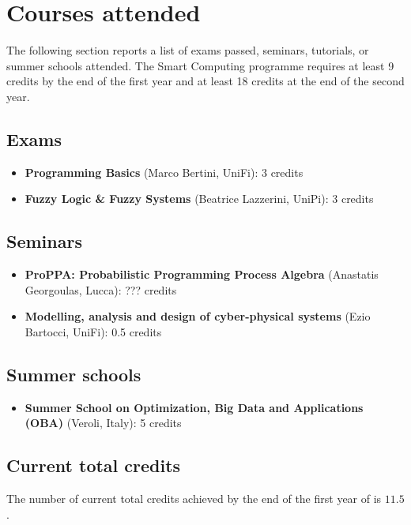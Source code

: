 
\section*{Courses attended}
  The following section reports a list of exams passed, seminars, tutorials, or summer schools attended. The Smart Computing  programme requires at least 9 credits by the end of the first year and at least 18 credits at the end of the second year.

  \subsection*{Exams}
  
    \begin{itemize}
      \item \textbf{ Programming Basics} (Marco Bertini, \ac{UniFi}): 3 credits
      \item \textbf{Fuzzy Logic \& Fuzzy Systems} (Beatrice Lazzerini, \ac{UniPi}): 3 credits
    \end{itemize}
    
  \subsection*{Seminars}
  
    \begin{itemize}
      \item \textbf{\ac{ProPPA}: Probabilistic Programming Process Algebra} (Anastatis Georgoulas,  Lucca): ??? credits
      \item \textbf{Modelling, analysis and design of cyber-physical systems} (Ezio Bartocci, \ac{UniFi}): 0.5 credits
    \end{itemize}
    
  \subsection*{Summer schools}
  
    \begin{itemize}
      \item \textbf{Summer School on Optimization, Big Data and Applications (\ac{OBA})} (Veroli, Italy): 5 credits
    \end{itemize}
    
  \subsection*{Current total credits}
  
    The number of current total credits achieved by the end of the first year of  is $11.5$.
    
\newpage
  